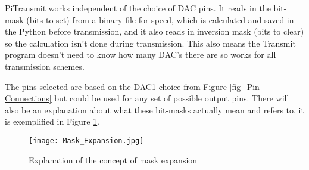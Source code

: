 \documentclass[../main.tex]{subfiles}
\begin{document}
PiTransmit works independent of the choice of DAC pins.
It reads in the bit-mask (bits to set) from a binary file for speed, which is calculated and saved in the Python before transmission, and it also reads in inversion mask (bits to clear) so the calculation isn't done during transmission.
This also means the Transmit program doesn't need to know how many DAC's there are so works for all transmission schemes.

The pins selected are based on the DAC1 choice from Figure \ref{fig_Pin Connections} but could be used for any set of possible output pins.
There will also be an explanation about what these bit-masks actually mean and refers to, it is exemplified in Figure \ref{fig_Mask Expansion}.

\begin{figure}[ht]
	\centering
	\texttt{[image: Mask\_Expansion.jpg]}
	\caption{Explanation of the concept of mask expansion}
	\label{fig_Mask Expansion}
\end{figure}
\end{document}
